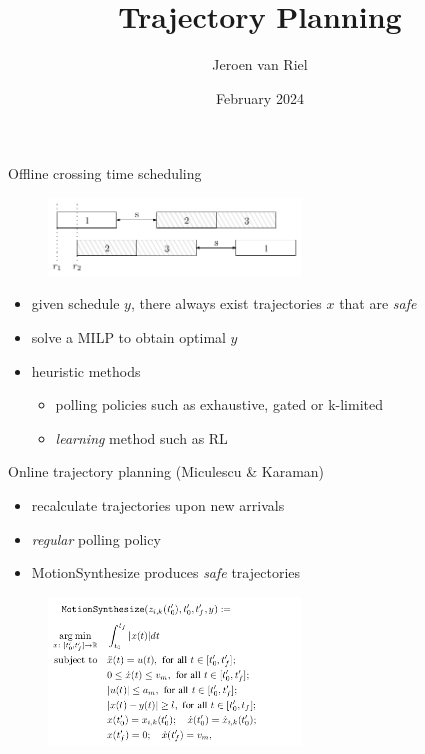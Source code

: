 \documentclass[bigger]{beamer}
\author{Jeroen van Riel}
\date{February 2024}
\title{Trajectory Planning}
\begin{document}
\maketitle
\begin{frame}[label={sec:org2c0fe4f}]{Offline crossing time scheduling}
\vfill
\begin{figure}
  \centering
  \includegraphics[width=0.6\textwidth]{figures/123.pdf}
\end{figure}

\begin{itemize}
\item given schedule \(y\), there always exist trajectories \(x\) that are \emph{safe}
\item solve a MILP to obtain optimal \(y\)
\item heuristic methods
\begin{itemize}
\item polling policies such as exhaustive, gated or k-limited
\item \emph{learning} method such as RL
\end{itemize}
\end{itemize}
\end{frame}
\begin{frame}[label={sec:org7e2b44e}]{Online trajectory planning (Miculescu \& Karaman)}
\begin{itemize}
\item recalculate trajectories upon new arrivals
\item \emph{regular} polling policy
\item MotionSynthesize produces \emph{safe} trajectories
\end{itemize}

\begin{figure}
  \centering
  \includegraphics[width=0.6\textwidth]{figures/MotionSynthesize.png}
\end{figure}
\end{frame}
\end{document}
